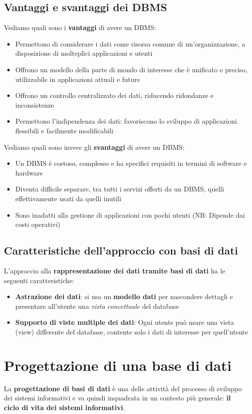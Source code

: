 \documentclass[12pt]{article}
\begin{document}
\subsection{Vantaggi e svantaggi dei DBMS}
Vediamo quali sono i \textbf{vantaggi} di avere un DBMS:
\begin{itemize}
    \item Permettono di considerare i dati come risorsa comune di un'organizzazione, a disposizione di molteplici applicazioni e utenti
    \item Offrono un modello della parte di mondo di interesse che è unificato e preciso, utilizzabile in applicazioni attuali e future
    \item Offrono un controllo centralizzato dei dati, riducendo ridondanze e inconsistenze
    \item Permettono l'indipendenza dei dati: favoriscono lo sviluppo di applicazioni flessibili e facilmente modificabili
\end{itemize}
Vediamo quali sono invece gli \textbf{svantaggi} di avere un DBMS:
\begin{itemize}
    \item Un DBMS è costoso, complesso e ha specifici requisiti in termini di software e hardware
    \item Diventa difficile separare, tra tutti i servizi offerti da un DBMS, quelli effettivamente usati da quelli inutili
    \item Sono inadatti alla gestione di applicazioni con pochi utenti (NB: Dipende dai costi operativi)
\end{itemize}
\subsection{Caratteristiche dell'approccio con basi di dati}
L'approccio alla \textbf{rappresentazione dei dati tramite basi di dati} ha le seguenti caratteristiche:
\begin{itemize}
    \item \textbf{Astrazione dei dati}: si usa un \textbf{modello dati} per nascondere dettagli e presentare all'utente una \textit{vista concettuale} del database
    \item \textbf{Supporto di viste multiple dei dati}: Ogni utente può usare una vista (view) differente del database, contente solo i dati di interesse per quell'utente
\end{itemize}
\section{Progettazione di una base di dati}
La \textbf{progettazione di basi di dati} è una delle attività del processo di sviluppo dei sistemi informativi e va quindi inquadrata in un contesto più generale: \textbf{il ciclo di vita dei sistemi informativi}.
\end{document}
